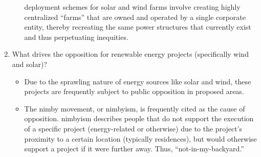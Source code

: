 \begin{enumerate}
\begin{itemize}
        deployment schemes for solar and wind farms involve creating highly centralized ``farms'' that are owned and operated
        by a single corporate entity, thereby recreating the same power structures that currently exist and thus perpetuating inequities.
    \end{itemize}
    \item What drives the opposition for renewable energy projects (specifically wind and solar)?
    \begin{itemize}
        \item Due to the sprawling nature of energy sources like solar and wind, these projects are frequently subject to 
        public opposition in proposed areas.
        \item The \ac{nimby} movement, or \acs{nimbyism}, is frequently cited as the cause of opposition. \acs{nimbyism} describes
        people that do not support the execution of a specific project (energy-related or otherwise) due to the project's proximity
        to a certain location (typically residences), but would otherwise support a project if it were further away. 
        Thus, ``not-in-my-backyard.''
    \end{itemize}
\end{enumerate}